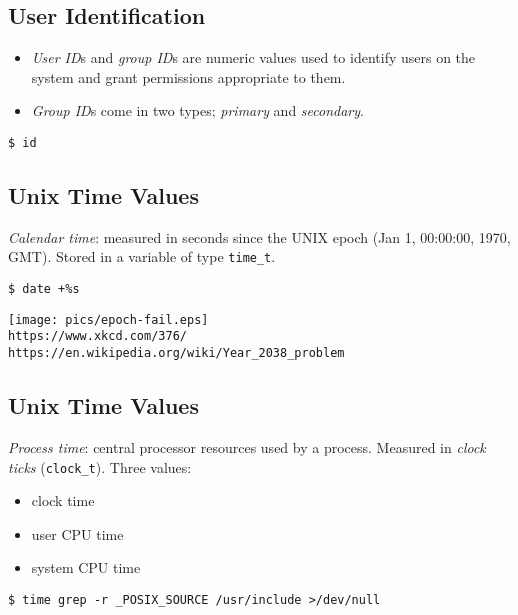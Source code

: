 \documentclass[sxga]{xdvislides}
\begin{document}
\subsection{User Identification}
\begin{itemize}
	\item {\em User ID}s and {\em group ID}s are numeric values used to
		identify users on the system and grant permissions appropriate to them.
	\item {\em Group ID}s come in two types; {\em primary} and {\em secondary}.
\end{itemize}
\vspace{.25in}

\begin{verbatim}
$ id
\end{verbatim}

\subsection{Unix Time Values}
{\em Calendar time}: measured in seconds since the UNIX epoch (Jan
1, 00:00:00, 1970, GMT). Stored in a variable of type {\tt time\_t}.
\\

\begin{verbatim}
$ date +%s
\end{verbatim}

\begin{center}
\texttt{[image: pics/epoch-fail.eps]} \\
\verb+https://www.xkcd.com/376/+ \\
\vspace{.25in}
\verb+https://en.wikipedia.org/wiki/Year_2038_problem+
\end{center}


\subsection{Unix Time Values}
{\em Process time}: central processor resources used by a process.
Measured in {\em clock ticks} ({\tt clock\_t}).  Three values:
\begin{itemize}
	\item clock time
	\item user CPU time
	\item system CPU time
\end{itemize}

\vspace*{\fill}
\begin{verbatim}
$ time grep -r _POSIX_SOURCE /usr/include >/dev/null
\end{verbatim}
\vspace*{\fill}
\end{document}
